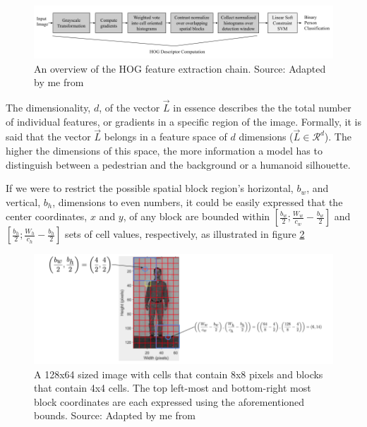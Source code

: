 \begin{figure}
    \centering
    \includegraphics[width=1\linewidth]{images/HOG Pipeline.png}
    \caption{An overview of the HOG feature extraction chain. Source: Adapted by me from \cite{dalal_2005_histograms}}
    \label{fig:hog_pipeline}
\end{figure}

The dimensionality, $d$, of the vector $\vec{L}$ in essence describes the the total number of individual features, or gradients in a specific region of the image. Formally, it is said that the vector $\vec{L}$ belongs in a feature space of $d$ dimensions ($\vec{L} \in \mathcal{R}^{d}$). The higher the dimensions of this space, the more information a model has to distinguish between a pedestrian and the background or a humanoid silhouette. 

If we were to restrict the possible spatial block region's horizontal, $b_w$, and vertical, $b_h$, dimensions to even numbers, it could be easily expressed that the center coordinates, $x$ and $y$, of any block are bounded within $\left[ \frac{b_w}{2}; \frac{W_w}{c_w} - \frac{b_w}{2}\right]$ and $\left[ \frac{b_h}{2}; \frac{W_h}{c_h} - \frac{b_h}{2}\right]$ sets of cell values, respectively, as illustrated in figure \ref{fig:center_coords}

\begin{figure}
    \centering
    \includegraphics[width=1\linewidth]{images/Center Coordinates.png}
    \caption{A 128x64 sized image with cells that contain 8x8 pixels and blocks that contain 4x4 cells. The top left-most and bottom-right most block coordinates are each expressed using the aforementioned bounds. Source: Adapted by me from \cite{shidlovskiy_2020_reducing}}
    \label{fig:center_coords}
\end{figure}


